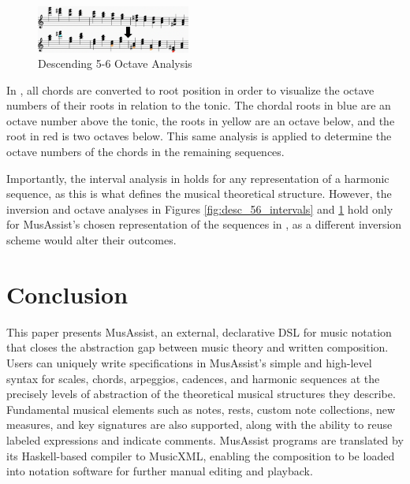 \documentclass{article}
\begin{document}
\begin{figure}[!htbp]
\centering
\includegraphics[width=0.45\textwidth]{images/desc56-example}
  \caption{Descending 5-6 Octave Analysis}
  \label{fig:desc56-example}
  \vspace{-5mm}
\end{figure}

In , all chords are converted to root position in order to visualize the octave numbers of their roots in relation to the tonic. The chordal roots in blue are an octave number above the tonic, the roots in yellow are an octave below, and the root in red is two octaves below. This same analysis is applied to determine the octave numbers of the chords in the remaining sequences.

Importantly, the interval analysis in  holds for any representation of a harmonic sequence, as this is what defines the musical theoretical structure. However, the inversion and octave analyses in Figures \ref{fig:desc_56_intervals} and \ref{fig:desc56-example} hold only for MusAssist’s chosen representation of the sequences in , as a different inversion scheme would alter their outcomes.

\section{Conclusion}
This paper presents MusAssist, an external, declarative DSL for music notation that closes the abstraction gap between music theory and written composition. Users can uniquely write specifications in MusAssist’s simple and high-level syntax for scales, chords, arpeggios, cadences, and harmonic sequences at the precisely levels of abstraction of the theoretical musical structures they describe. Fundamental musical elements such as notes, rests, custom note collections, new measures, and key signatures are also supported, along with the ability to reuse labeled expressions and indicate comments. MusAssist programs are translated by its Haskell-based compiler to MusicXML, enabling the composition to be loaded into notation software for further manual editing and playback.
\end{document}
